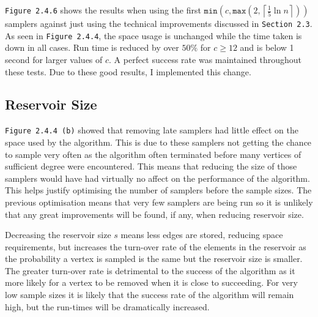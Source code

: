 \documentclass[11pt,twoside,a4paper]{report}
\begin{document}
\par \texttt{Figure 2.4.6} shows the results when using the first $\mathtt{min}\left(c,\mathtt{max}\left(2,\left\lceil\frac15\ln n\right\rceil\right)\right)$ samplers against just using the technical improvements discussed in \texttt{Section 2.3}. As seen in \texttt{Figure 2.4.4}, the space usage is unchanged while the time taken is down in all cases. Run time is reduced by over $50\%$ for $c\geq 12$ and is below 1 second for larger values of $c$. A perfect success rate was maintained throughout these tests. Due to these good results, I implemented this change.
\subsection{Reservoir Size}

\par \texttt{Figure 2.4.4 (b)} showed that removing late samplers had little effect on the space used by the algorithm. This is due to these samplers not getting the chance to sample very often as the algorithm often terminated before many vertices of sufficient degree were encountered. This means that reducing the size of those samplers would have had virtually no affect on the performance of the algorithm. This helps justify optimising the number of samplers before the sample sizes. The previous optimisation means that very few samplers are being run so it is unlikely that any great improvements will be found, if any, when reducing reservoir size.

\par Decreasing the reservoir size $s$ means less edges are stored, reducing space requirements, but increases the turn-over rate of the elements in the reservoir as the probability a vertex is sampled is the same but the reservoir size is smaller. The greater turn-over rate is detrimental to the success of the algorithm as it more likely for a vertex to be removed when it is close to succeeding. For very low sample sizes it is likely that the success rate of the algorithm will remain high, but the run-times will be dramatically increased.
\end{document}
